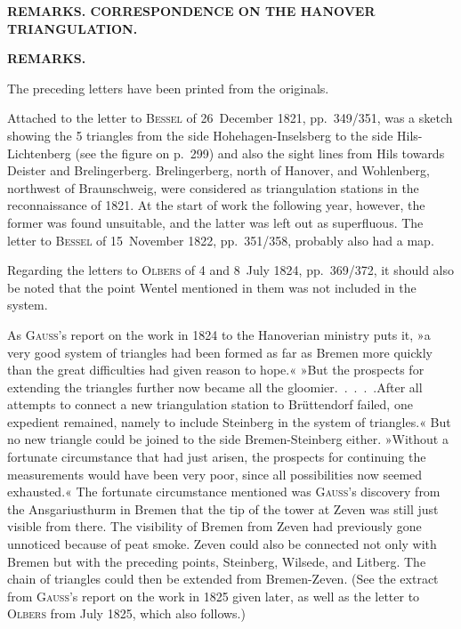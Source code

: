\par\clearpage
\noindent\null\hfill{\footnotesize\textbf{REMARKS. CORRESPONDENCE ON THE HANOVER TRIANGULATION.}}\hfill{}\par\medskip
\begin{center}\textbf{REMARKS.}\end{center}
\begingroup\small
\par\noindent\hspace*{\parindent}The preceding letters have been printed from the originals.
\par\noindent\hspace*{\parindent}Attached to the letter to \textsc{Bessel} of 26~December 1821, pp.~349/351, was a sketch showing the 5 triangles from the side Hohehagen-Inselsberg to the side Hils-Lichtenberg (see the figure on p.~299) and also the sight lines from Hils towards Deister and Brelingerberg. Brelingerberg, north of Hanover, and Wohlenberg, northwest of Braunschweig, were considered as triangulation stations in the reconnaissance of 1821. At the start of work the following year, however, the former was found unsuitable, and the latter was left out as superfluous. The letter to \textsc{Bessel} of 15~November 1822, pp.~351/358, probably also had a map.
\par\noindent\hspace*{\parindent}Regarding the letters to \textsc{Olbers} of 4 and 8~July 1824, pp.~369/372, it should also be noted that the point Wentel mentioned in them was not included in the system.
\par\noindent\hspace*{\parindent}As \textsc{Gauss}'s report on the work in 1824 to the Hanoverian ministry puts it, »a very good system of triangles had been formed as far as Bremen more quickly than the great difficulties had given reason to hope.« »But the prospects for extending the triangles further now became all the gloomier.\ \mbox{.\ .\ .\ .}\quad After all attempts to connect a new triangulation station to Brüttendorf failed, one expedient remained, namely to include Steinberg in the system of triangles.« But no new triangle could be joined to the side Bremen-Steinberg either. »Without a fortunate circumstance that had just arisen, the prospects for continuing the measurements would have been very poor, since all possibilities now seemed exhausted.« The fortunate circumstance mentioned was \textsc{Gauss}'s discovery from the Ansgariusthurm in Bremen that the tip of the tower at Zeven was still just visible from there. The visibility of Bremen from Zeven had previously gone unnoticed because of peat smoke. Zeven could also be connected not only with Bremen but with the preceding points, Steinberg, Wilsede, and Litberg. The chain of triangles could then be extended from Bremen-Zeven. (See the extract from \textsc{Gauss}'s report on the work in 1825 given later, as well as the letter to \textsc{Olbers} from July 1825, which also follows.)
